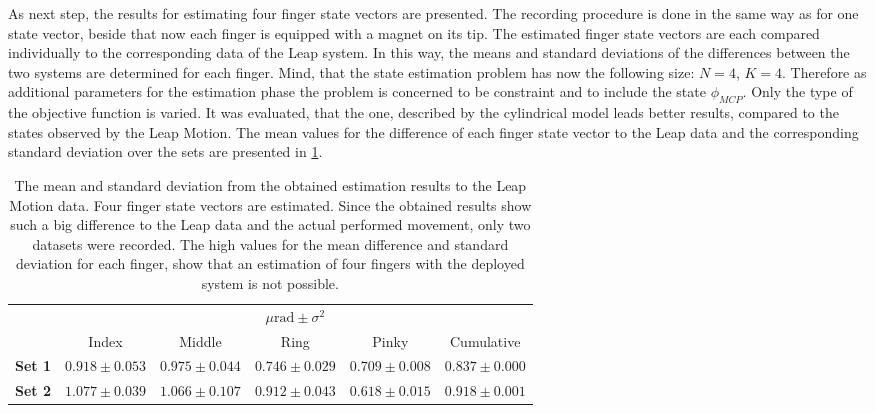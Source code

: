 As next step, the results for estimating four finger state vectors are presented. The recording procedure is done in the same way as for one state vector, beside that now each finger is equipped with a magnet on its tip. The estimated finger state vectors are each compared individually to the corresponding data of the Leap system. In this way, the means and standard deviations of the differences between the two systems are determined for each finger. Mind, that the state estimation problem has now the following size: $ N = 4 $, $ K = 4 $. Therefore as additional parameters for the estimation phase the problem is concerned to be constraint and to include the state $ \phi_{MCP} $. Only the type of the objective function is varied. It was evaluated, that the one, described by the cylindrical model leads better results, compared to the states observed by the Leap Motion. The mean values for the difference of each finger state vector to the Leap data and the corresponding standard deviation over the sets are presented in \ref{tab:estSetFour}. 
\begin{table}
\centering
\begin{tabular}{l c c c c c}
\toprule
&  \multicolumn{5}{c}{$ \mu \si{\radian} \pm \sigma^{2} $} \\ \cmidrule{2-6}
& 			   				 Index 				 & Middle 			   & Ring 				 & Pinky 			   &  Cumulative \\ \midrule
\textbf{Set 1} &  $ 0.918 \pm 0.053 $ & $ 0.975 \pm 0.044 $ & $ 0.746 \pm 0.029 $ & $ 0.709 \pm 0.008 $ & $ 0.837 \pm 0.000 $ \\ 
\textbf{Set 2} &  $ 1.077 \pm 0.039 $ & $ 1.066 \pm 0.107 $ & $ 0.912 \pm 0.043 $ & $ 0.618 \pm 0.015 $ & $ 0.918 \pm 0.001 $ \\ \bottomrule
\end{tabular}
\caption[Difference of estimated states, compared to Leap Motion data for four finger estimation]
{The mean and standard deviation from the obtained estimation results to the Leap Motion data. Four finger state vectors are estimated. Since the obtained results show such a big difference to the Leap data and the actual performed movement, only two datasets were recorded. The high values for the mean difference and standard deviation for each finger, show that an estimation of four fingers with the deployed system is not possible.}
\label{tab:estSetFour}
\end{table}
